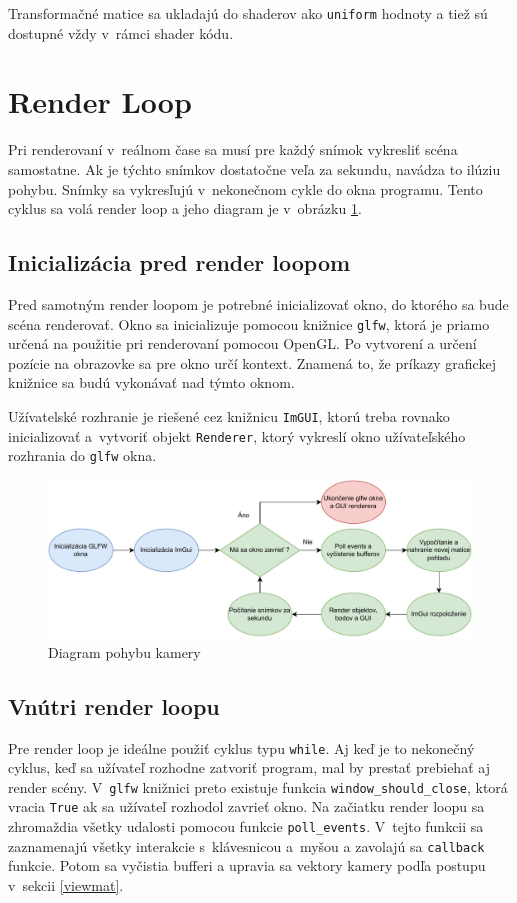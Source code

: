 Transformačné matice sa ukladajú do shaderov ako \verb|uniform| hodnoty a tiež sú dostupné vždy v~rámci shader kódu.

\section{Render Loop}
Pri renderovaní v~reálnom čase sa musí pre každý snímok vykresliť scéna samostatne. Ak je týchto snímkov dostatočne veľa za sekundu, navádza to ilúziu pohybu. Snímky sa vykresľujú v~nekonečnom cykle do okna programu. Tento cyklus sa volá render loop a jeho diagram je v~obrázku \ref{RLDia}.

\subsection*{Inicializácia pred render loopom}
Pred samotným render loopom je potrebné inicializovať okno, do ktorého sa bude scéna renderovať. Okno sa inicializuje pomocou knižnice \verb|glfw|, ktorá je priamo určená na použitie pri renderovaní pomocou OpenGL. Po vytvorení a určení pozície na obrazovke sa pre okno určí kontext. Znamená to, že príkazy grafickej knižnice sa budú vykonávať nad týmto oknom.

Užívatelské rozhranie je riešené cez knižnicu \verb|ImGUI|, ktorú treba rovnako inicializovať a~vytvoriť objekt \verb|Renderer|, ktorý vykreslí okno užívateľského rozhrania do \verb|glfw| okna.

\begin{figure}[b!] \label{RLDia}
    \centering
    \includegraphics[width=0.95\linewidth]{obrazky-figures/RenderLoop.drawio.pdf}
    \caption{Diagram pohybu kamery}
\end{figure}

\subsection*{Vnútri render loopu}
Pre render loop je ideálne použiť cyklus typu \verb|while|. Aj keď je to nekonečný cyklus, keď sa užívateľ rozhodne zatvoriť program, mal by prestať prebiehať aj render scény. V~\verb|glfw| knižnici preto existuje funkcia \verb|window_should_close|, ktorá vracia \verb|True| ak sa užívateľ rozhodol zavrieť okno. Na začiatku render loopu sa zhromaždia všetky udalosti pomocou funkcie \verb|poll_events|. V~tejto funkcii sa zaznamenajú všetky interakcie s~klávesnicou a~myšou a zavolajú sa \verb|callback| funkcie. Potom sa vyčistia bufferi a upravia sa vektory kamery podľa postupu v~sekcii \ref{viewmat}.

